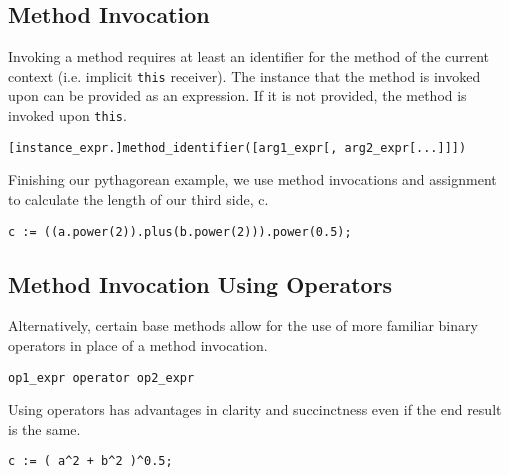 \subsection{Method Invocation}
Invoking a method requires at least an identifier for the method of the current context (i.e. implicit \verb!this! receiver). The instance that the method is invoked upon can be provided as an expression. If it is not provided, the method is invoked upon \verb!this!.

\begin{lstlisting}
[instance_expr.]method_identifier([arg1_expr[, arg2_expr[...]]])
\end{lstlisting}

Finishing our pythagorean example, we use method invocations and assignment to calculate the length of our third side, c.

\begin{lstlisting}[label=Method Invocation,caption=Method Invocation for the Pythagorean Theorem Using Methods]
c := ((a.power(2)).plus(b.power(2))).power(0.5);
\end{lstlisting}

\subsection{Method Invocation Using Operators}
Alternatively, certain base methods allow for the use of more familiar binary operators in place of a method invocation.

\begin{lstlisting}
op1_expr operator op2_expr
\end{lstlisting}

Using operators has advantages in clarity and succinctness even if the end result is the same.

\begin{lstlisting}[label=Method Invocation,caption=Method Invocation for the Pythagorean Theorem Using Operators]
c := ( a^2 + b^2 )^0.5;
\end{lstlisting}

